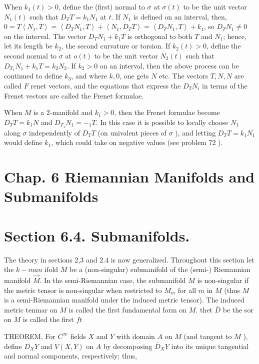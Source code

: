 \documentclass[10pt]{article}
\begin{document}
When $k_{1}(t)>0$, define the (first) normal to $\sigma$ at $\sigma(t)$ to be the unit vector $N_{1}(t)$ such that $D_{T} T=k_{1} N_{1}$ at $t$. If $N_{1}$ is defined on an interval, then, $0=T\left\langle N_{1}, T\right\rangle=\left\langle D_{T} N_{1}, T\right\rangle+\left\langle N_{1}, D_{T} T\right\rangle=\left\langle D_{T} N_{1}, T\right\rangle+k_{1}$, so $D_{T} N_{1} \neq 0$ on the interval. The vector $D_{T} N_{1}+k_{1} T$ is orthogonal to both $T$ and $N_{1}$; hence, let its length be $k_{2}$, the second curvature or torsion. If $k_{2}(t)>0$, define the second normal to $\sigma$ at $o(t)$ to be the unit vector $N_{2}(t)$ such that $D_{T_{1}} N_{1}+k_{1} T=k_{2} N_{2} .$ If $k_{2}>0$ on an interval, then the above process can be continued to define $k_{3}$, and where $k, 0$, one gets $N$ etc. The vectors $T, N, N$ are called $F$ renet vectors, and the equations that express the $D_{T} N_{i}$ in terms of the Frenet vectors are called the Frenet formulae.

When $M$ is a 2-manifold and $k_{1}>0$, then the Frenet formulae become $D_{T} T=k_{1} N$ and $D_{T_{1}} N_{1}=-_{1} T$. In this case it is possible to locally choose $N_{1}$ along $\sigma$ independently of $D_{T} T$ (on univalent pieces of $\sigma$ ), and letting $D_{T} T=k_{1} N_{1}$ would define $k_{1}$, which could take on negative values (see problem 72 ).

\section{Chap. 6 Riemannian Manifolds and Submanifolds}
\section{Section 6.4. Submanifolds.}
The theory in sections 2,3 and $2.4$ is now generalized. Throughout this section let the $k-m a n$ ifold $M$ be a (non-singular) submanifold of the (semi-) Riemannian manifold $\vec{M}$. In the semi-Riemannian case, the submanifold $M$ is non-singular if the metric tensor is non-singular when restricted to $M_{m}$ for all $m$ in $M$ (thus $M$ is a semi-Riemannian manifold under the induced metric tensor). The induced metric tenmar on $M$ is called the first fundamental form on $M$. thet $\bar{D}$ be the sor on $M$ is called the first $f t$

THEOREM, For $C^{\infty}$ fields $X$ and $Y$ with domain $A$ on $M$ (and tangent to $M$ ), define $D_{X} Y$ and $V(X, Y)$ on $A$ by decomposing $\bar{D}_{X} Y$ into its unique tangential and normal components, respectively; thus,
\end{document}
